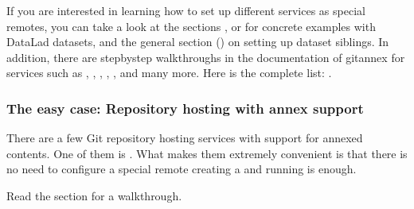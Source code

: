 \begin{figure}[tbp]
\centering

\noindent{}
\end{figure}

\sphinxAtStartPar
If you are interested in learning how to set up different services as special remotes, you can take a look at the sections ,  or  for concrete examples with DataLad datasets, and the general section {\hyperref[\detokenize{basics/101-139-hostingservices:share-hostingservice}]{}} () on setting up dataset siblings.
In addition, there are step\sphinxhyphen{}by\sphinxhyphen{}step walk\sphinxhyphen{}throughs in the documentation of git\sphinxhyphen{}annex for services such as , ,
,
,
, and many more.
Here is the complete list: .


\subsubsection{The easy case: Repository hosting with annex support}
\label{\detokenize{basics/101-138-sharethirdparty:the-easy-case-repository-hosting-with-annex-support}}
\sphinxAtStartPar
There are a few Git repository hosting services with support for annexed contents.
One of them is {\hyperref[\detokenize{glossary:term-GIN}]{}}.
What makes them extremely convenient is that there is no need to configure a special remote \textendash{} creating a {\hyperref[\detokenize{glossary:term-sibling}]{}} and running  is enough.

\begin{figure}[tbp]
\centering

\noindent{}
\end{figure}

\sphinxAtStartPar
Read the section  for a walk\sphinxhyphen{}through.


